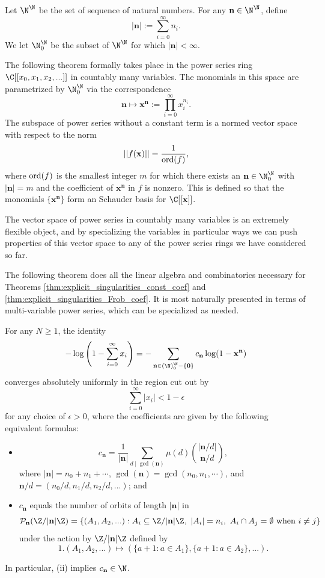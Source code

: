 \documentclass[12pt]{amsart}
\theoremstyle{plain}
\begin{document}
Let $\N^\N$ be the set of sequence of natural numbers. For any $\mathbf{n}\in \N^\N$, define
\[
    |\mathbf{n}| := \sum_{i=0}^{\infty} n_i.
\]
We let $\N^{\N}_0$ be the subset of $\N^\N$ for which $|\mathbf{n}|<\infty$.

The following theorem formally takes place in the power series ring $\C[[x_0,x_1,x_2,...]]$ in countably many variables. The monomials in this space are parametrized by $\N^\N_0$ via the correspondence
\[
\mathbf{n} \mapsto \mathbf{x}^\mathbf{n} := \prod_{i=0}^\infty x_i^{n_i}.
\]
The subspace of power series without a constant term is a normed vector space with respect to the norm
\[
    ||f(\mathbf{x})|| = \frac{1}{{\rm ord}(f)},
\]
where ${\rm ord}(f)$ is the smallest integer $m$ for which there exists an $\mathbf{n}\in \N^\N_0$ with $|\mathbf{n}|=m$ and the coefficient of $\mathbf{x}^{\mathbf{n}}$ in $f$ is nonzero. This is defined so that the monomials $\{\mathbf{x}^{\mathbf{n}}\}$ form an Schauder basis for $\C[[\mathbf{x}]]$.

The vector space of power series in countably many variables is an extremely flexible object, and by specializing the variables in particular ways we can push properties of this vector space to any of the power series rings we have considered so far.

The following theorem does all the linear algebra and combinatorics necessary for Theorems \ref{thm:explicit_singularities_const_coef} and \ref{thm:explicit_singularities_Frob_coef}. It is most naturally presented in terms of multi-variable power series, which can be specialized as needed.

\begin{theorem}\label{thm:log}
For any $N\ge 1$, the identity
\[
-\log\left(1 - \sum_{i=0}^\infty x_i\right) = -\sum_{\mathbf{n}\in (\N)^{\N}_0-\{\mathbf{0}\}} c_\mathbf{n} \log( 1 - \mathbf{x}^\mathbf{n} )
\]
converges absolutely uniformly in the region cut out by
\[
\sum_{i=0}^\infty |x_i|<1-\epsilon
\]
for any choice of $\epsilon>0$, where the coefficients are given by the following equivalent formulas:
\begin{itemize}
    \item[(i)]
    \[
    c_\mathbf{n} = \frac{1}{|\mathbf{n}|}\sum_{d\mid \gcd(\mathbf{n})} \mu(d) {|\mathbf{n}/d|\choose \mathbf{n}/d},
    \]
    where $|\mathbf{n}|=n_0+n_1+\cdots$, $\gcd(\mathbf{n})=\gcd(n_0,n_1,\cdots)$, and $\mathbf{n}/d=(n_0/d,n_1/d,n_2/d,...)$; and
    \item[(ii)] $c_\mathbf{n}$ equals the number of orbits of length $|\mathbf{n}|$ in
    \[
    \mathcal{P}_{\mathbf{n}}(\Z/|\mathbf{n}|\Z)=\{(A_1,A_2,...) : A_i\subseteq \Z/|\mathbf{n}|\Z,\ |A_i|=n_i,\ A_i\cap A_j = \emptyset\text{ when }i\ne j\}
    \]
    under the action by $\Z/|\mathbf{n}|\Z$ defined by
    \[
    1.(A_1,A_2,...)\mapsto (\{a+1:a\in A_1\},\{a+1:a\in A_2\},...).
    \]
\end{itemize}
In particular, (ii) implies $c_\mathbf{n}\in\N$.
\end{theorem}
\end{document}
